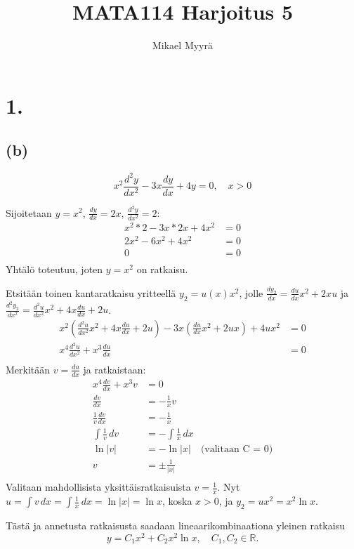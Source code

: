 \documentclass{article}
\title{MATA114 Harjoitus 5}
\author{Mikael Myyrä}
\date{}
\begin{document}
\maketitle

\section*{1.}

\subsection*{(b)}

\[
  x^2\frac{d^2 y}{d x^2} - 3x\frac{dy}{dx} + 4y = 0, \quad x > 0
\]

Sijoitetaan $y = x^2$, $\frac{dy}{dx} = 2x$, $\frac{d^2 y}{d x^2} = 2$:
\begin{align*}
  x^2*2 - 3x*2x + 4x^2 &= 0 \\
  2x^2 - 6x^2 + 4x^2 &= 0 \\
  0 &= 0 \\
\end{align*}
Yhtälö toteutuu, joten $y = x^2$ on ratkaisu.

Etsitään toinen kantaratkaisu yritteellä $y_2 = u(x)x^2$,
jolle $\frac{dy_2}{dx} = \frac{du}{dx}x^2 + 2xu$ ja
$\frac{d^2 y_2}{d x^2} = \frac{d^2 u}{d x^2}x^2 + 4x\frac{du}{dx} + 2u$.
\begin{align*}
  x^2(\frac{d^2 u}{d x^2}x^2 + 4x\frac{du}{dx} + 2u)
  - 3x(\frac{du}{dx}x^2 + 2ux) + 4ux^2 &= 0 \\
  x^4\frac{d^2 u}{d x^2} + x^3\frac{du}{dx} &= 0 \\
\end{align*}
Merkitään $v = \frac{du}{dx}$ ja ratkaistaan:
\begin{align*}
  x^4\frac{dv}{dx} + x^3v &= 0 \\
  \frac{dv}{dx} &= -\frac{1}{x}v \\
  \frac{1}{v}\frac{dv}{dx} &= -\frac{1}{x} \\
  \int \frac{1}{v}\,dv &= -\int \frac{1}{x}\,dx \\
  \ln |v| &= -\ln |x| \quad \text{(valitaan C = 0)} \\
  v &= \pm \frac{1}{|x|} \\
\end{align*}
Valitaan mahdollisista yksittäisratkaisuista
$v = \frac{1}{x}$.
Nyt $u = \int v\,dx = \int \frac{1}{x}\,dx = \ln |x| = \ln x$, koska $x > 0$,
ja $y_2 = ux^2 = x^2\ln x$.

Tästä ja annetusta ratkaisusta saadaan lineaarikombinaationa yleinen ratkaisu
\[
  y = C_1x^2 + C_2x^2\ln x, \quad C_1,C_2 \in \mathbb{R}.
\]
\end{document}
